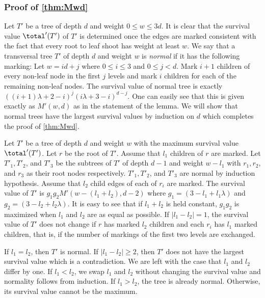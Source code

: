 \subsubsection{Proof of \cref{thm:Mwd}}

Let $T'$ be a tree of depth $d$ and weight $0\leq w\leq 3d$.
It is clear that the survival value $\total'(T')$ of $T'$ is determined once
the edges are marked consistent with the fact that every root to leaf shoot has weight at least $w$.
We say that a transversal tree $T'$ of depth $d$ and weight $w$ is \emph{normal} if it has the following marking:
Let $w=id+j$ where $0\leq i\leq 3$ and $0\leq j<d$.
Mark $i+1$ children of every non-leaf node in the 
first $j$ levels and mark $i$ children
for each of the remaining non-leaf nodes. The survival value of normal tree is exactly $((i+1)\lambda + 2 - i)^j(i\lambda + 3 - i)^{d - j}$. One can easily see that this is given exactly as $M'(w,d)$ as in the statement of the lemma.
We will show that normal trees have the largest
survival values by induction on $d$ which completes the proof
of \cref{thm:Mwd}.

Let $T'$ be a tree of depth $d$ and weight $w$ with the maximum survival value $\total'(T')$.
Let $r$ be the root of $T'$. Assume that $l_1$ children of $r$ are marked.
Let $T'_1, T'_2$, and $T'_3$ be the subtrees of $T'$ of depth $d-1$ 
and weight $w-l_1$ with $r_1, r_2$, and $r_3$ as their root nodes respectively.
$T'_1, T'_2$, and $T'_3$ are normal by induction hypothesis.
Assume that $l_2$ child edges of each of $r_i$ are marked.
The survival value of $T'$ is 
$g_1 g_2 M'(w-(l_1+l_2), d-2)$ where
$g_1= (3-l_1 +l_1 \lambda)$ and $g_2=(3-l_2 + l_2\lambda)$.
It is easy to see that if $l_1+l_2$ is held constant, $g_1 g_2$ is maximized when $l_1$ and $l_2$
are as equal as possible. If $|l_1-l_2|=1$, the survival value of $T'$ does not change if $r$ has marked $l_2$ children and 
each $r_i$ has $l_1$ marked children, that is, if the number of markings of the first two levels are exchanged.

If $l_1 = l_2$, then $T'$ is normal.
If $|l_1-l_2|\geq 2$, then $T'$ does not have the largest
survival value which is a contradiction.
We are left with the case that  $l_1$ and $l_2$ differ by one. If $l_1<l_2$, we swap $l_1$ and $l_2$ without changing the survival value and normality follows from induction. If $l_1>l_2$, the tree is already normal. Otherwise, its survival value cannot be the maximum. 



